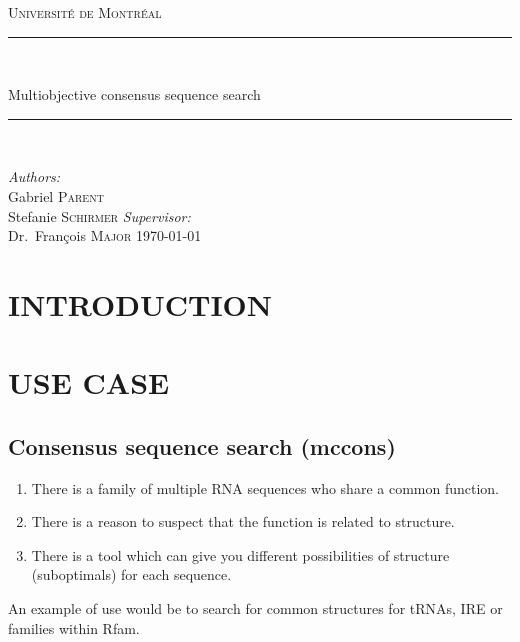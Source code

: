 \documentclass[a4paper, 12pt] {article}
\newcommand{\HRule}{\rule{\linewidth}{0.5mm}}
\begin{document}

\begin{titlepage}
\begin{center}
\textsc{\LARGE Université de Montréal}\\[1.5cm]

\HRule \\[0.4cm]

{\huge Multiobjective consensus sequence search
\HRule \\[0.4cm]}
\vfill
\emph{Authors:}\\
Gabriel \textsc{Parent}\\
Stefanie \textsc {Schirmer}
\vfill
\emph{Supervisor:} \\
Dr.~François \textsc{Major}
\vfill
{\large \today}
\end{center}
\end{titlepage}


\section*{INTRODUCTION}

\noindent
\section*{USE CASE}
\subsection*{Consensus sequence search (mccons)}
\begin{enumerate}
  \item There is a family of multiple RNA sequences who share a common function.
  \item There is a reason to suspect that the function is related to structure. 
  \item There is a tool which can give you different possibilities of structure (suboptimals) for each sequence.
\end{enumerate}
An example of use would be to search for common structures for tRNAs, IRE or families within Rfam.
\end{document}

